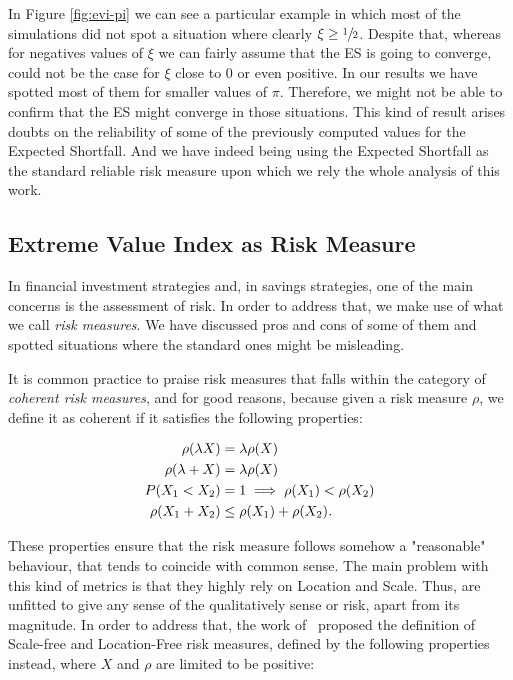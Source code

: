 In Figure \ref{fig:evi-pi} we can see a particular example in which most of the simulations did not spot a situation where clearly $\xi \geq \sfrac{1}{2}$. Despite that, whereas for negatives values of $\xi$ we can fairly assume that the ES is going to converge, could not be the case for $\xi$ close to $0$ or even positive. In our results we have spotted most of them for smaller values of $\pi$. Therefore, we might not be able to confirm that the ES might converge in those situations. This kind of result arises doubts on the reliability of some of the previously computed values for the Expected Shortfall. And we have indeed being using the Expected Shortfall as the standard reliable risk measure upon which we rely the whole analysis of this work.


\subsection{Extreme Value Index as Risk Measure}

In financial investment strategies and, in savings strategies, one of the main concerns is the assessment of risk. In order to address that, we make use of what we call \emph{risk measures}. We have discussed pros and cons of some of them and spotted situations where the standard ones might be misleading.

It is common practice to praise risk measures that falls within the category of \emph{coherent risk measures}, and for good reasons, because given a risk measure $\rho$, we define it as coherent if it satisfies the following properties:

\begin{align}
\begin{split}
    \rho(\lambda X) &= \lambda \rho (X) \\
    \rho(\lambda  + X) &= \lambda \rho(X) \\
    P(X_1 < X_2) &= 1 \implies \rho(X_1) < \rho(X_2) \\
    \rho(X_1 + X_2) &\leq \rho(X_1) + \rho(X_2) \emph{.}
\end{split}
\end{align}

These properties ensure that the risk measure follows somehow a "reasonable" behaviour, that tends to coincide with common sense. The main problem with this kind of metrics is that they highly rely on Location and Scale. Thus, are unfitted to give any sense of the qualitatively sense or risk, apart from its magnitude. In order to address that, the work of~\cite{a:iserra-risk} proposed the definition of Scale-free and Location-Free risk measures, defined by the following properties instead, where $X$ and $\rho$ are limited to be positive:

